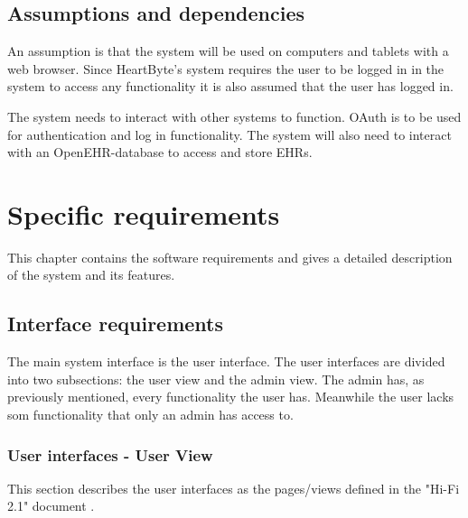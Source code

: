 \documentclass{scrreprt}
\begin{document}
\section{Assumptions and dependencies}
An assumption is that the system will be used on computers and tablets with a web browser. Since HeartByte's system requires the user to be logged in in the system to access any functionality it is also assumed that the user has logged in.

The system needs to interact with other systems to function. OAuth is to be used for authentication and log in functionality. The system will also need to interact with an OpenEHR-database to access and store EHRs. 



\chapter{Specific requirements}
This chapter contains the software requirements and gives a detailed
description of the system and its features. 

\section{Interface requirements}
The main system interface is the user interface. The user interfaces are divided into two subsections: the user view and the admin view. The admin has, as previously mentioned, every functionality the user has. Meanwhile the user lacks som functionality that only an admin has access to. 

\subsection{User interfaces -  User View}
This section describes the user interfaces as the pages/views defined in the "Hi-Fi 2.1" document \cite{prototype}.
\end{document}
